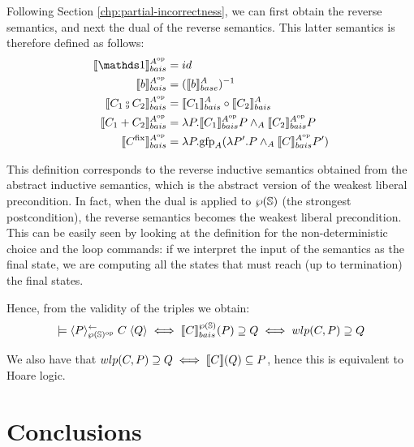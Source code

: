 \documentclass[
  10pt,       %
  twoside,    %
  a4paper,    %
  english,    %
  tikz,       %
  openright,  %
]{book}
\begin{document}
Following Section \ref{chp:partial-incorrectness}, we can first
obtain the reverse semantics, and next the dual of the reverse
semantics. This latter semantics is therefore defined as follows: 
\begin{align*}
  \asemback[A^{\mathrm{op}}]{\sskip}        &= id \\
  \asemback[A^{\mathrm{op}}]{b}             &= (\bsem{b}^A)^{-1} \\
  \asemback[A^{\mathrm{op}}]{C_1 \fcmp C_2} &= \asemback{C_1} \circ \asemback{C_2} \\
  \asemback[A^{\mathrm{op}}]{C_1 + C_2}     &= \lambda P . \asemback[A^{\mathrm{op}}]{C_1} P \meet_A \asemback[A^{\mathrm{op}}]{C_2} P \\
  \asemback[A^{\mathrm{op}}]{C^\fix}        &= \lambda P . \gfp_A(\lambda P'. P \meet_A \asemback[A^{\mathrm{op}}]{C} P')
\end{align*}

This definition corresponds to the reverse inductive semantics obtained from
the abstract inductive semantics, which is the abstract version of the weakest
liberal precondition. In fact, when the dual is applied to $\pow\states$ (the
strongest postcondition), the reverse semantics becomes the weakest liberal
precondition. This can be easily seen by looking at the definition for the
non-deterministic choice and the loop commands: if we interpret the input of
the semantics as the final state, we are computing all the states that must
reach (up to termination) the final states.

Hence, from the validity of the triples we obtain:
$$\models \atripleback[\pow{\states}^{\mathrm{op}}]{P}{C}{Q} \iff
\asemback[\pow{\states}]{C}(P) \supseteq Q \iff wlp(C, P) \supseteq Q$$

\noindent
We  also have that $wlp(C, P) \supseteq Q \iff \sem{C}(Q) \subseteq P$, hence this is
equivalent to Hoare logic.

\chapter{Conclusions}
\end{document}
